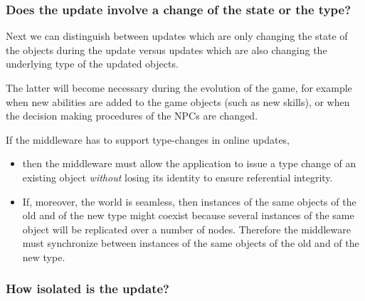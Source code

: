 \documentclass[a4paper, 10pt]{book}
\begin{document}
            \subsubsection{Does the update involve a change of the state or the type?}
            \label{sec:does-update-involve}

            Next we can distinguish between updates which are only changing the
            state of the objects during the update versus updates which are also
            changing the underlying type of the updated objects.

            The latter will become necessary during the evolution of the game, for
            example when new abilities are added to the game objects (such as new
            skills), or when the decision making procedures of the NPCs are
            changed.

            If the middleware has to support type-changes in online updates,
            \begin{itemize}
                \item then the middleware must allow the application to issue a type
                    change of an existing object \emph{without} losing its identity to
                    ensure referential integrity.
                \item If, moreover, the world is seamless, then instances of the same
                    objects of the old and of the new type might coexist because several
                    instances of the same object will be replicated over a number of
                    nodes.
                    Therefore the middleware must synchronize between instances of the
                    same objects of the old and of the new type. 
            \end{itemize}

            \subsubsection{How isolated is the update?}
\end{document}
